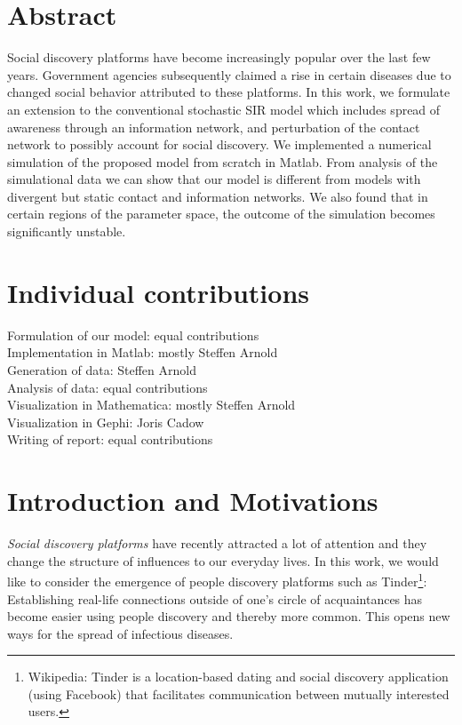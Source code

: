 \documentclass[11pt]{article}
\begin{document}
\newpage




\section{Abstract}

Social discovery platforms have become increasingly popular over the last few years. Government agencies subsequently claimed a rise in certain diseases due to changed social behavior attributed to these platforms. In this work, we formulate an extension to the conventional stochastic SIR model which includes spread of awareness through an information network, and perturbation of the contact network to possibly account for social discovery. We implemented a numerical simulation of the proposed model from scratch in Matlab. From analysis of the simulational data we can show that our model is different from models with divergent but static contact and information networks. We also found that in certain regions of the parameter space, the outcome of the simulation becomes significantly unstable.


\section{Individual contributions}

Formulation of our model: equal contributions\\
Implementation in Matlab: mostly Steffen Arnold\\
Generation of data: Steffen Arnold\\
Analysis of data: equal contributions\\
Visualization in Mathematica: mostly Steffen Arnold\\
Visualization in Gephi: Joris Cadow\\
Writing of report: equal contributions



\section{Introduction and Motivations}

\textit{Social discovery platforms} have recently attracted a lot of attention and they change the structure of influences to our everyday lives.
In this work, we would like to consider the emergence of people discovery platforms such as Tinder\footnote{Wikipedia: Tinder is a location-based dating and social discovery application (using Facebook) that facilitates communication between mutually interested users.}: Establishing real-life connections outside of one's circle of acquaintances has become easier using people discovery and thereby more common.
This opens new ways for the spread of infectious diseases.
\end{document}
